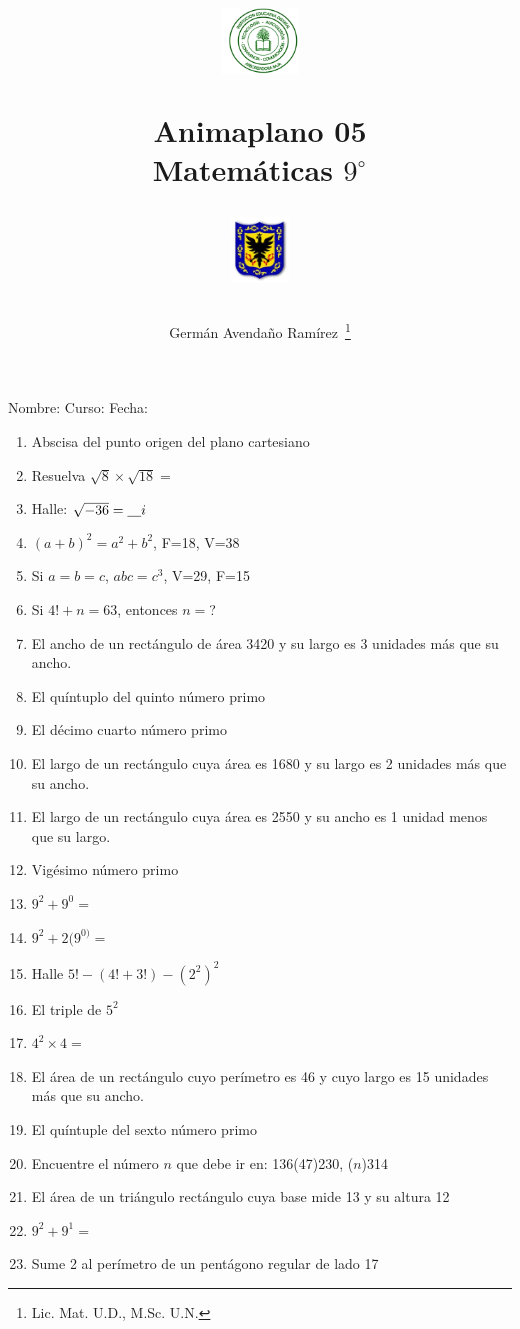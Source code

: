 \documentclass[letterpaper,11pt,twoside]{article}
\author{Germ\'an Avenda\~no Ram\'irez~\thanks{Lic. Mat. U.D., M.Sc. U.N.}}
\title{\begin{minipage}{.2\textwidth}
\includegraphics[height=1.75cm]{Images/logo-colegio.png}\end{minipage}
\begin{minipage}{.55\textwidth}
\begin{center}
Animaplano 05\\
Matemáticas $9^{\circ}$
\end{center}
\end{minipage}\hfill
\begin{minipage}{.2\textwidth}
\includegraphics[height=1.75cm]{Images/logo-sed.png} 
\end{minipage}}
\date{}
\begin{document}
\maketitle
Nombre: \hrulefill Curso: \underline{\hspace*{44pt}} Fecha: \underline{\hspace*{2.5cm}}
\begin{multicols}{2}
 \begin{enumerate}
 \item Abscisa del punto origen del plano cartesiano
 \item Resuelva $\sqrt{8}\times \sqrt{18}=$
 \item Halle: $\sqrt{-36}=\underline{\hspace*{10pt}}i$
 \item $(a+b)^{2}=a^{2}+b^{2}$, \qquad F=18, \; V=38
 \item Si $a=b=c$, $abc=c^{3}$, \qquad V=29, \; F=15
 \item Si $4!+n=63$, entonces $n=$?
 \item El ancho de un rectángulo de área 3420 y su largo es 3 unidades más que su ancho.
 \item El quíntuplo del quinto número primo
 \item El décimo cuarto número primo
 \item El largo de un rectángulo cuya área es 1680 y su largo es 2 unidades más que su ancho.
 \item El largo de un rectángulo cuya área es 2550 y su ancho es 1 unidad menos que su largo.
 \item Vigésimo número primo
 \item $9^{2}+9^{0}=$
 \item $9^{2}+2(9^{0)}=$
 \item Halle $5!-(4!+3!)-(2^{2})^{2}$
 \item El triple de $5^{2}$
 \item $4^{2}\times 4=$
 \item El área de un rectángulo cuyo perímetro es 46 y cuyo largo es 15 unidades más que su ancho.
 \item El quíntuple del sexto número primo
 \item Encuentre el número $n$ que debe ir en: 136(47)230, ($n$)314
 \item El área de un triángulo rectángulo cuya base mide 13 y su altura 12
 \item $9^{2}+9^{1}=$
 \item Sume 2 al perímetro de un pentágono regular de lado 17

\end{enumerate}
\end{multicols}
\end{document}
